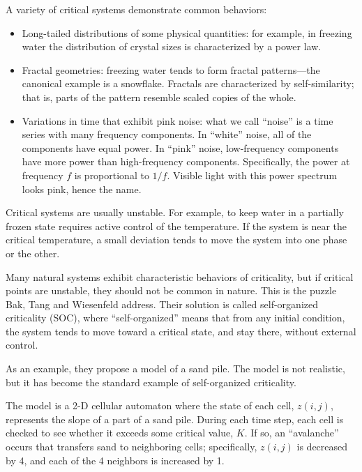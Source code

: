 \documentclass[10pt]{book}
\begin{document}
A variety of critical systems demonstrate common behaviors:

\begin{itemize}

\item Long-tailed distributions of some physical quantities: for
  example, in freezing water the distribution of crystal sizes is
  characterized by a power law.

\item Fractal geometries: freezing water tends to form fractal
  patterns---the canonical example is a snowflake.  Fractals
  are characterized by self-similarity; that is, parts of the
  pattern resemble scaled copies of the whole.

\item Variations in time that exhibit pink noise: what we call
  ``noise'' is a time series with many frequency components.  In
  ``white'' noise, all of the components have equal power.  In
  ``pink'' noise, low-frequency components have more power than
  high-frequency components.  Specifically, the power at frequency $f$
  is proportional to $1/f$.  Visible light with this power spectrum
  looks pink, hence the name.

\end{itemize}

Critical systems are usually unstable.  For example, to keep
water in a partially frozen state requires active control of
the temperature.  If the system is near the critical
temperature, a small deviation tends to move the system
into one phase or the other.

Many natural systems exhibit characteristic behaviors of
criticality, but if critical points are unstable, they should
not be common in nature.  This is the puzzle Bak, Tang and
Wiesenfeld address.  Their solution is called self-organized
criticality (SOC), where ``self-organized'' means that from
any initial condition, the system tends to move toward a
critical state, and stay there, without external control.

As an example, they propose a model of a sand pile.  The model is not
realistic, but it has become the standard example of self-organized
criticality.

The model is a 2-D cellular automaton where the state of each cell,
$z(i,j)$, represents the slope of a part of a sand pile.  During each
time step, each cell is checked to see whether it exceeds some
critical value, $K$.  If so, an ``avalanche'' occurs that transfers
sand to neighboring cells; specifically, $z(i,j)$ is decreased by 4,
and each of the 4 neighbors is increased by 1.
\end{document}
